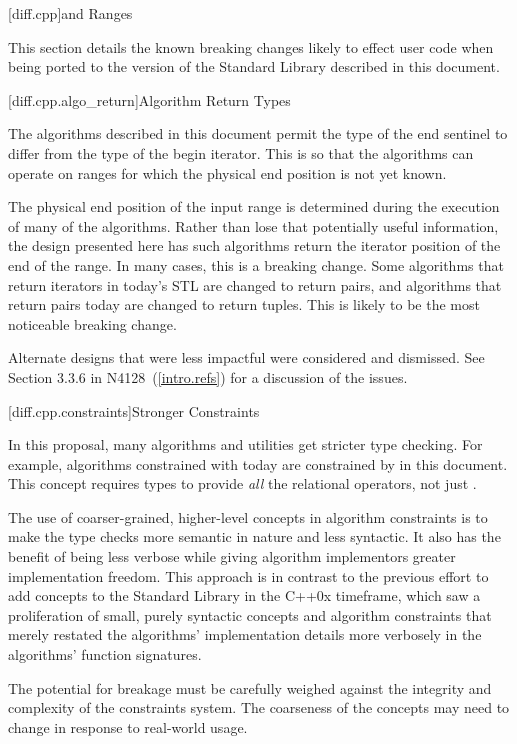 
[diff.cpp]{\Cpp and Ranges}

\pnum
This section details the known breaking changes likely to effect user code when being ported to the
version of the Standard Library described in this document.

[diff.cpp.algo_return]{Algorithm Return Types}

\pnum
The algorithms described in this document permit the type of the end sentinel to differ from the
type of the begin iterator. This is so that the algorithms can operate on ranges for which the
physical end position is not yet known.

\pnum
The physical end position of the input range is determined during the execution of many of the
algorithms. Rather than lose that potentially useful information, the design presented here has such
algorithms return the iterator position of the end of the range. In many cases, this is a breaking
change. Some algorithms that return iterators in today's STL are changed to return pairs, and
algorithms that return pairs today are changed to return tuples. This is likely to be the most
noticeable breaking change.

\pnum
Alternate designs that were less impactful were considered and dismissed. See Section 3.3.6 in
N4128~(\ref{intro.refs}) for a discussion of the issues.

[diff.cpp.constraints]{Stronger Constraints}

\pnum
In this proposal, many algorithms and utilities get stricter type checking. For example, algorithms
constrained with  today are constrained by  in this
document. This concept requires types to provide \textit{all} the relational operators, not just
.

\pnum
The use of coarser-grained, higher-level concepts in algorithm constraints is to make the type
checks more semantic in nature and less syntactic. It also has the benefit of being less verbose
while giving algorithm implementors greater implementation freedom. This approach is in contrast to
the previous effort to add concepts to the Standard Library in the C++0x timeframe, which saw a
proliferation of small, purely syntactic concepts and algorithm constraints that merely restated the
algorithms' implementation details more verbosely in the algorithms' function signatures.

\pnum
The potential for breakage must be carefully weighed against the integrity and complexity of the
constraints system. The coarseness of the concepts may need to change in response to real-world
usage.

